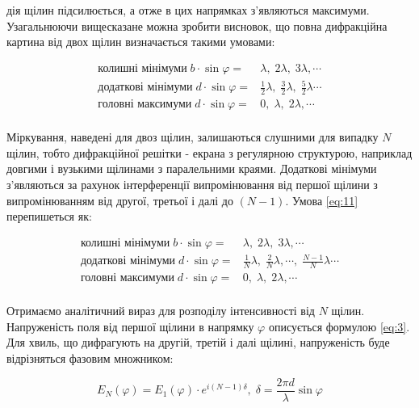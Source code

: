 дія щілин підсилюється, а отже в цих напрямках з'являються
максимуми. Узагальнюючи вищесказане можна зробити висновок,
що повна дифракційна картина від двох щілин визначається такими
умовами:

\begin{equation} \label{eq:11}
    \begin{aligned}
        \text{колишні мінімуми} \; b \cdot \sin{\varphi} =& \lambda, \; 2 \lambda, \; 3 \lambda, \cdots \\
        \text{додаткові мінімуми} \; d \cdot \sin{\varphi} =& \frac{1}{2} \lambda, \; \frac{3}{2} \lambda, \; \frac{5}{2} \lambda \cdots \\
        \text{головні максимуми} \; d \cdot \sin{\varphi} =& 0, \; \lambda, \; 2 \lambda, \cdots \\
    \end{aligned}
\end{equation}

Міркування, наведені для двоз щілин, залишаються слушними для
випадку $N$ щілин, тобто дифракційної решітки - екрана з
регулярною структурою, наприклад довгими і вузькими щілинами
з паралельними краями. Додаткові мінімуми з'являються за рахунок
інтерференції випромінювання від першої щілини з випромінюванням
від другої, третьої і далі до $(N-1)$. Умова \ref{eq:11} перепишеться як:

\begin{equation} \label{eq:12}
    \begin{aligned}
        \text{колишні мінімуми} \; b \cdot \sin{\varphi} =& \lambda, \; 2 \lambda, \; 3 \lambda, \cdots \\
        \text{додаткові мінімуми} \; d \cdot \sin{\varphi} =& \frac{1}{N} \lambda, \; \frac{2}{N} \lambda ,\cdots, \; \frac{N-1}{N} \lambda \cdots \\
        \text{головні максимуми} \; d \cdot \sin{\varphi} =& 0, \; \lambda, \; 2 \lambda, \cdots \\
    \end{aligned}
\end{equation}


Отримаємо аналітичний вираз для розподілу інтенсивності від $N$ щілин.
Напруженість поля від першої щілини в напрямку $\varphi$ 
описується формулою \ref{eq:3}. Для хвиль, що дифрагують 
на другій, третій і далі щілині, напруженість буде відрізняться
фазовим множником:

\begin{equation} \label{eq:13}
    E_N(\varphi) = E_1(\varphi) \cdot e^{i(N-1)\delta}, \;
    \delta = \frac{2 \pi d}{\lambda} \sin{\varphi}
\end{equation}

